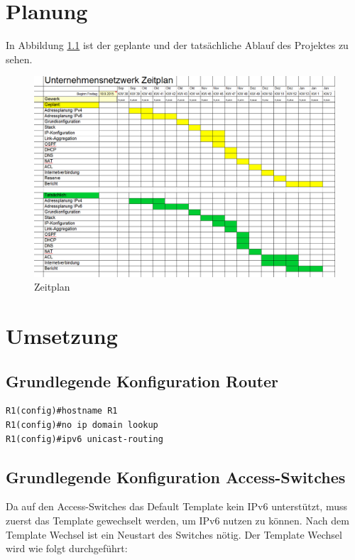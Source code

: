 \documentclass[11pt,a4paper]{scrreprt}
\begin{document}
\newpage
\chapter{Planung}
In Abbildung \ref{abb:Zeitplan} ist der geplante und der tatsächliche Ablauf des Projektes zu sehen. 
\begin{figure}[H]
\begin{center}
\includegraphics[angle=90,scale=0.52]{Zeitplan.png}
\caption{Zeitplan}
\label{abb:Zeitplan}
\end{center}
\end{figure}

\chapter{Umsetzung}


\section{Grundlegende Konfiguration Router}

 \begin{lstlisting}[frame=single, captionpos=b,caption= Router Grund Konfig]
R1(config)#hostname R1
R1(config)#no ip domain lookup
R1(config)#ipv6 unicast-routing
\end{lstlisting}

\section{Grundlegende Konfiguration Access-Switches}
Da auf den Access-Switches das Default Template kein IPv6 unterstützt, muss zuerst das Template gewechselt werden, um IPv6 nutzen zu können. Nach dem Template Wechsel ist ein Neustart des Switches nötig. Der Template Wechsel wird wie folgt durchgeführt:
\newline
\end{document}
